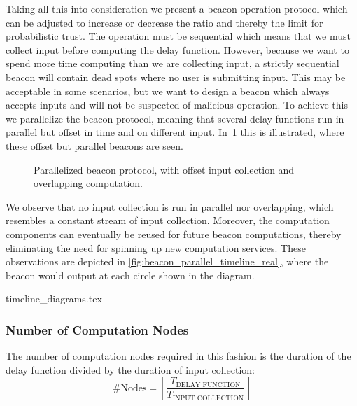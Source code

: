 Taking all this into consideration we present a beacon operation protocol which can be adjusted to increase or decrease the ratio and thereby the limit for probabilistic trust.
The operation must be sequential which means that we must collect input before computing the delay function.
However, because we want to spend more time computing than we are collecting input, a strictly sequential beacon will contain dead spots where no user is submitting input.
This may be acceptable in some scenarios, but we want to design a beacon which always accepts inputs and will not be suspected of malicious operation.
To achieve this we parallelize the beacon protocol, meaning that several delay functions run in parallel but offset in time and on different input.
In~\cref{fig:beacon_parallel_timeline} this is illustrated, where these offset but parallel beacons are seen.
\begin{figure}[htb]
    \centering
    \footnotesize
    \caption{Parallelized beacon protocol, with offset input collection and overlapping computation.}\label{fig:beacon_parallel_timeline}
\end{figure}

We observe that no input collection is run in parallel nor overlapping, which resembles a constant stream of input collection.
Moreover, the computation components can eventually be reused for future beacon computations, thereby eliminating the need for spinning up new computation services.
These observations are depicted in \cref{fig:beacon_parallel_timeline_real}, where the beacon would output at each circle shown in the diagram.

{timeline_diagrams.tex}

\subsubsection{Number of Computation Nodes}
The number of computation nodes required in this fashion is the duration of the delay function divided by the duration of input collection:
\begin{equation*}
    \#\text{Nodes} = \left\lceil\frac{T_\text{DELAY FUNCTION}}{T_\text{INPUT COLLECTION}}\right\rceil
\end{equation*}

